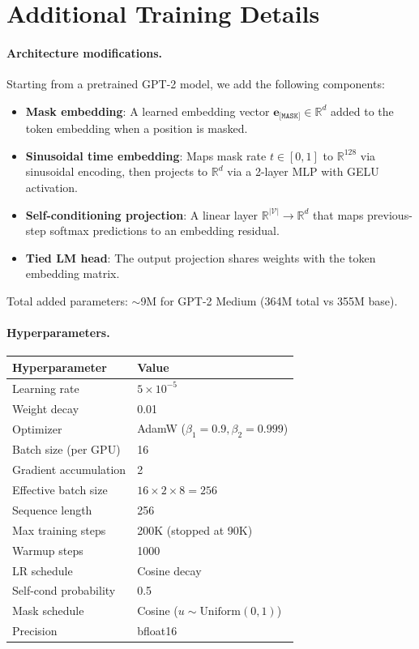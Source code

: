 \documentclass{article}
\newcommand{\mask}{\texttt{[MASK]}}
\newcommand{\R}{\mathbb{R}}
\newcommand{\V}{\mathcal{V}}
\begin{document}
\newpage
\appendix

\section{Additional Training Details}
\label{app:training}

\paragraph{Architecture modifications.}
Starting from a pretrained GPT-2 model, we add the following components:
\begin{itemize}
    \item \textbf{Mask embedding}: A learned embedding vector $\mathbf{e}_{\mask} \in \R^d$ added to the token embedding when a position is masked.
    \item \textbf{Sinusoidal time embedding}: Maps mask rate $t \in [0,1]$ to $\R^{128}$ via sinusoidal encoding, then projects to $\R^d$ via a 2-layer MLP with GELU activation.
    \item \textbf{Self-conditioning projection}: A linear layer $\R^{|\V|} \to \R^d$ that maps previous-step softmax predictions to an embedding residual.
    \item \textbf{Tied LM head}: The output projection shares weights with the token embedding matrix.
\end{itemize}

Total added parameters: $\sim$9M for GPT-2 Medium (364M total vs 355M base).

\paragraph{Hyperparameters.}
\begin{center}
\begin{tabular}{ll}
\toprule
Hyperparameter & Value \\
\midrule
Learning rate & $5 \times 10^{-5}$ \\
Weight decay & 0.01 \\
Optimizer & AdamW ($\beta_1{=}0.9, \beta_2{=}0.999$) \\
Batch size (per GPU) & 16 \\
Gradient accumulation & 2 \\
Effective batch size & $16 \times 2 \times 8 = 256$ \\
Sequence length & 256 \\
Max training steps & 200K (stopped at 90K) \\
Warmup steps & 1000 \\
LR schedule & Cosine decay \\
Self-cond probability & 0.5 \\
Mask schedule & Cosine ($u \sim \text{Uniform}(0,1)$) \\
Precision & bfloat16 \\
\bottomrule
\end{tabular}
\end{center}
\end{document}

